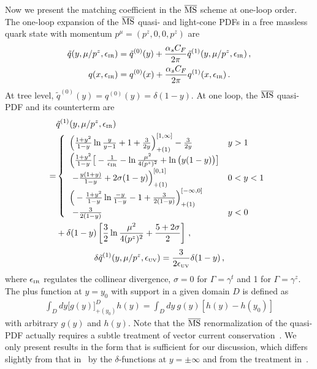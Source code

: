 Now we present the matching coefficient in the ${\overline{\rm MS}}$ scheme at one-loop order.
The one-loop expansion of the ${\overline{\rm MS}}$ quasi- and light-cone PDFs in a free massless quark state with momentum $p^\mu=(p^z,0,0,p^z)$ are
\begin{align}
	\tilde{q}(y,\mu/p^z,\epsilon_{\mbox{\tiny IR}}) &= \tilde{q}^{(0)}(y) + {\alpha_sC_F\over 2\pi}\tilde{q}^{(1)}(y,\mu/p^z,\epsilon_{\mbox{\tiny IR}})\,,\\
	q(x,\epsilon_{\mbox{\tiny IR}}) &= q^{(0)}(x) + {\alpha_sC_F\over 2\pi}q^{(1)}(x,\epsilon_{\mbox{\tiny IR}})\,.
\end{align}
At tree level, $\tilde{q}^{(0)}(y) = q^{(0)}(y) = \delta(1-y)$.
At one loop, the ${\overline{\rm MS}}$ quasi-PDF and its counterterm are~\cite{Izubuchi:2018srq}
\begin{align}\label{eq:qPDFren}
	&\tilde{q}^{(1)}(y,\mu/p^z,\epsilon_{\mbox{\tiny IR}}) \nonumber\\
	=&\left\{
	\begin{array}{ll}
		\Big({1+y^2\over 1-y}\ln {y\over y-1} + 1 + {3\over 2y}\Big)^{[1,\infty]}_{+(1)}- {3\over 2y} & y>1\\
		\Big({1+y^2\over 1-y}\big[- {1\over \epsilon_{\mbox{\tiny IR}}} - \ln{\mu^2\over 4(p^z)^2} + \ln\big(y(1-y)\big)\big] &\\
		\  - {y(1+y)\over 1-y}+ 2\sigma (1-y)\Big)^{[0,1]}_{+(1)}  &0<y<1\\
		\Big(-{1+y^2\over 1-y}\ln {-y\over 1-y} - 1 + {3\over 2(1-y)}\Big)^{[-\infty,0]}_{+(1)}&\\
		\ - {3\over 2(1-y)} & y<0
	\end{array}\right.\nonumber\\
	&+ \delta(1-y)\left[{3\over2}\ln{\mu^2\over 4(p^z)^2} + {5 + 2\sigma\over2}\right]\,,
\end{align}
\begin{align}
	\delta \tilde{q}^{(1)}(y,\mu/p^z,\epsilon_{\mbox{\tiny UV}})
	= {3\over 2\epsilon_{\mbox{\tiny UV}}}
	\delta(1-y)\,,
\end{align}
where $\epsilon_{\mbox{\tiny IR}}$ regulates the collinear divergence, $\sigma=0$ for $\Gamma=\gamma^t$ and 1 for $\Gamma=\gamma^z$. The plus function at $y=y_0$ with support in a given domain $D$ is defined as
\begin{align}
	\int_D\! dy \big[ g(y)\big]_{+(y_0)}^D h(y)\! =\! \int_D\! dy\ g(y) \left[ h(y)\! -\! h(y_0)\right]
\end{align}
with arbitrary $g(y)$ and $h(y)$. Note that the ${\overline{\rm MS}}$ renormalization of the quasi-PDF actually requires a subtle treatment of vector current conservation~\cite{Izubuchi:2018srq}. We only present results in the form that is sufficient for our discussion, which differs slightly from that in~\cite{Izubuchi:2018srq} by the $\delta$-functions at $y=\pm\infty$ and from the treatment in~\cite{Alexandrou:2019lfo}.


